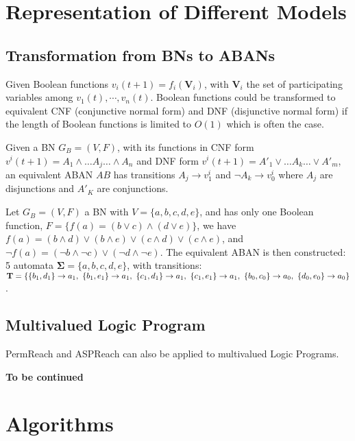 \chapter{Representation of Different Models}
\section{Transformation from BNs to ABANs}\label{appendix:trans}

Given Boolean functions $v_i(t+1)=f_i(\mathbf{V}_i)$, with $\mathbf{V}_i$ the set of participating variables among $v_1(t),\cdots,v_n(t)$.
Boolean functions could be transformed to equivalent CNF (conjunctive normal form) and DNF (disjunctive normal form) if the length of Boolean functions is limited to $O(1)$ \cite{miltersen2005converting} which is often the case.

\begin{proposition}
Given a BN $G_B=(V,F)$, with its functions in CNF form $v^i(t+1)=A_1\land\ldots A_j \ldots\land A_n$ and DNF form $v^i(t+1)=A'_1\lor\ldots A_k\ldots\lor A'_m$, an equivalent ABAN $AB$ has transitions $A_j\to v^i_1$ and $\lnot A_k\to v^i_0$ where $A_j$ are disjunctions and $A'_K$ are conjunctions.
\end{proposition}

\begin{example}
Let $G_B=(V,F)$ a BN with $V=\{a,b,c,d,e\}$, and has only one Boolean function, $F=\{f(a)= (b\lor c)\land(d\lor e)\}$, we have 
$f(a)=(b\land d)\lor(b\land e)\lor(c\land d)\lor(c\land e)$, and $\lnot f(a)=(\lnot b\land \lnot c)\lor(\lnot d\land \lnot e)$. 
The equivalent ABAN is then constructed: 5 automata $\mathbf{\Sigma}=\{a,b,c,d,e\}$, with transitions: $\mathbf{T}=\{\acm{b_1,d_1}{a_0}{a_1},\ \acm{b_1,e_1}{a_0}{a_1},\ \acm{c_1,d_1}{a_0}{a_1},\ \acm{c_1,e_1}{a_0}{a_1},\ \acm{b_0,c_0}{a_1}{a_0},\ \acm{d_0,e_0}{a_1}{a_0}\}$.
\end{example}

\section{Multivalued Logic Program}
PermReach and ASPReach can also be applied to multivalued Logic Programs.

\textbf{To be continued}

\chapter{Algorithms}

